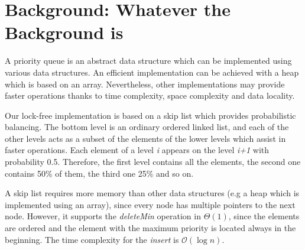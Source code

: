 \section{Background: Whatever the Background is}\label{sec:background}

A priority queue is an abstract data structure which can be implemented using various data structures.
An efficient implementation can be achieved with a heap which is based on an array.
Nevertheless, other implementations may provide faster operations thanks to time complexity, space complexity and data locality.

Our lock-free implementation is based on a skip list which provides probabilistic balancing.
The bottom level is an ordinary ordered linked list, and each of the other levels acts as a subset of the elements of the lower levels which assist in faster operations.
Each element of a level \textit{i} appears on the level \textit{i+1} with probability 0.5.
Therefore, the first level contains all the elements, the second one contains 50\% of them, the third one 25\% and so on.

A skip list requires more memory than other data structures (e.g a heap which is implemented using an array), since every node has multiple pointers to the next node.
However, it supports the \textit{deleteMin} operation in $\Theta(1)$, since the elements are ordered and the element with the maximum priority is located always in the beginning.
The time complexity for the \textit{insert} is $\mathcal{O}(\log{}n)$.






